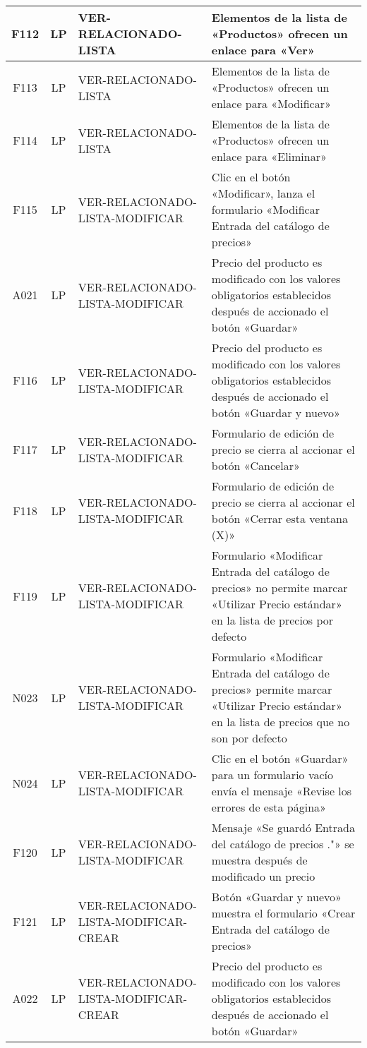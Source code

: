 \begin{landscape}
{\begin{longtable}[htb]{|c|c|p{5.0cm}|p{14.0cm}|}
F112 & LP & VER-RELACIONADO-LISTA & Elementos de la lista de «Productos» ofrecen un enlace para «Ver» \\ \hline
F113 & LP & VER-RELACIONADO-LISTA & Elementos de la lista de «Productos» ofrecen un enlace para «Modificar» \\ \hline
F114 & LP & VER-RELACIONADO-LISTA & Elementos de la lista de «Productos» ofrecen un enlace para «Eliminar» \\ \hline
F115 & LP & VER-RELACIONADO-LISTA-MODIFICAR & Clic en el botón «Modificar», lanza el formulario «Modificar Entrada del catálogo de precios» \\ \hline
A021 & LP & VER-RELACIONADO-LISTA-MODIFICAR & Precio del producto es modificado con los valores obligatorios establecidos después de accionado el botón «Guardar» \\ \hline
F116 & LP & VER-RELACIONADO-LISTA-MODIFICAR & Precio del producto es modificado con los valores obligatorios establecidos después de accionado el botón «Guardar y nuevo» \\ \hline
F117 & LP & VER-RELACIONADO-LISTA-MODIFICAR & Formulario de edición de precio se cierra al accionar el botón «Cancelar» \\ \hline
F118 & LP & VER-RELACIONADO-LISTA-MODIFICAR & Formulario de edición de precio se cierra al accionar el botón «Cerrar esta ventana (X)» \\ \hline
F119 & LP & VER-RELACIONADO-LISTA-MODIFICAR & Formulario «Modificar Entrada del catálogo de precios» no permite marcar «Utilizar Precio estándar» en la lista de precios por defecto \\ \hline
N023 & LP & VER-RELACIONADO-LISTA-MODIFICAR & Formulario «Modificar Entrada del catálogo de precios» permite marcar «Utilizar Precio estándar» en la lista de precios que no son por defecto \\ \hline
N024 & LP & VER-RELACIONADO-LISTA-MODIFICAR & Clic en el botón «Guardar» para un formulario vacío envía el mensaje «Revise los errores de esta página» \\ \hline
F120 & LP & VER-RELACIONADO-LISTA-MODIFICAR & Mensaje «Se guardó Entrada del catálogo de precios ."» se muestra después de modificado un precio \\ \hline
F121 & LP & VER-RELACIONADO-LISTA-MODIFICAR-CREAR & Botón «Guardar y nuevo» muestra el formulario «Crear Entrada del catálogo de precios» \\ \hline
A022 & LP & VER-RELACIONADO-LISTA-MODIFICAR-CREAR & Precio del producto es modificado con los valores obligatorios establecidos después de accionado el botón «Guardar» \\ \hline

\end{longtable}}
\end{landscape}
